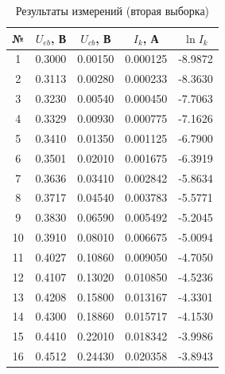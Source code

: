 \begin{table}[h]
\centering
\caption{Результаты измерений (вторая выборка)}
\label{tab:data2}
\begin{tabular}{|c|c|c|c|c|}
\hline
№ & $U_{eb}$, В & $U_{cb}$, В & $I_k$, А & $\ln I_k$ \\
\hline
1 & 0.3000 & 0.00150 & 0.000125 & -8.9872 \\
2 & 0.3113 & 0.00280 & 0.000233 & -8.3630 \\
3 & 0.3230 & 0.00540 & 0.000450 & -7.7063 \\
4 & 0.3329 & 0.00930 & 0.000775 & -7.1626 \\
5 & 0.3410 & 0.01350 & 0.001125 & -6.7900 \\
6 & 0.3501 & 0.02010 & 0.001675 & -6.3919 \\
7 & 0.3636 & 0.03410 & 0.002842 & -5.8634 \\
8 & 0.3717 & 0.04540 & 0.003783 & -5.5771 \\
9 & 0.3830 & 0.06590 & 0.005492 & -5.2045 \\
10 & 0.3910 & 0.08010 & 0.006675 & -5.0094 \\
11 & 0.4027 & 0.10860 & 0.009050 & -4.7050 \\
12 & 0.4107 & 0.13020 & 0.010850 & -4.5236 \\
13 & 0.4208 & 0.15800 & 0.013167 & -4.3301 \\
14 & 0.4300 & 0.18860 & 0.015717 & -4.1530 \\
15 & 0.4410 & 0.22010 & 0.018342 & -3.9986 \\
16 & 0.4512 & 0.24430 & 0.020358 & -3.8943 \\
\hline
\end{tabular}
\end{table}
